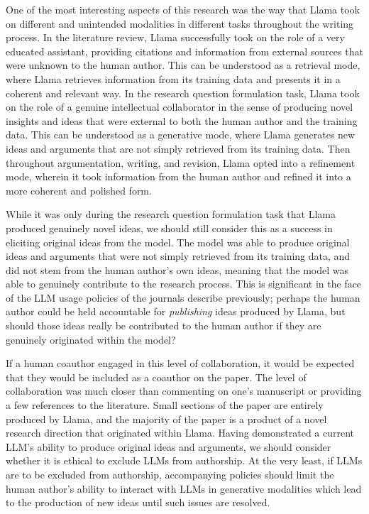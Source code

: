 One of the most interesting aspects of this research was the way that Llama took
on different and unintended modalities in different tasks throughout the writing
process. In the literature review, Llama successfully took on the role of a 
very educated assistant, providing citations and information from external
sources that were unknown to the human author. This can be understood as a
retrieval mode, where Llama retrieves information from its training data and
presents it in a coherent and relevant way. In the research question
formulation task, Llama took on the role of a genuine intellectual collaborator
in the sense of producing novel insights and ideas that were external to both
the human author and the training data. This can be understood as a generative
mode, where Llama generates new ideas and arguments that are not simply
retrieved from its training data. Then throughout argumentation, writing, and 
revision, Llama opted into a refinement mode, wherein it took information from
the human author and refined it into a more coherent and polished form.

While it was only during the research question formulation task that Llama
produced genuinely novel ideas, we should still consider this as a success in
eliciting original ideas from the model. The model was able to produce original
ideas and arguments that were not simply retrieved from its training data, and
did not stem from the human author's own ideas, meaning that the model was able
to genuinely contribute to the research process. This is significant in the face
of the LLM usage policies of the journals describe previously; perhaps the human
author could be held accountable for \emph{publishing} ideas produced by Llama, 
but should those ideas really be contributed to the human author if they are
genuinely originated within the model?

If a human coauthor engaged in this level of collaboration, it would be
expected that they would be included as a coauthor on the paper. The level of 
collaboration was much closer than commenting on one's manuscript or providing
a few references to the literature. Small sections of the paper are entirely
produced by Llama, and the majority of the paper is a product of a novel 
research direction that originated within Llama. Having demonstrated a current
LLM's ability to produce original ideas and arguments, we should consider 
whether it is ethical to exclude LLMs from authorship. At the very least, if
LLMs are to be excluded from authorship, accompanying policies should limit the
human author's ability to interact with LLMs in generative modalities which 
lead to the production of new ideas until such issues are resolved.

